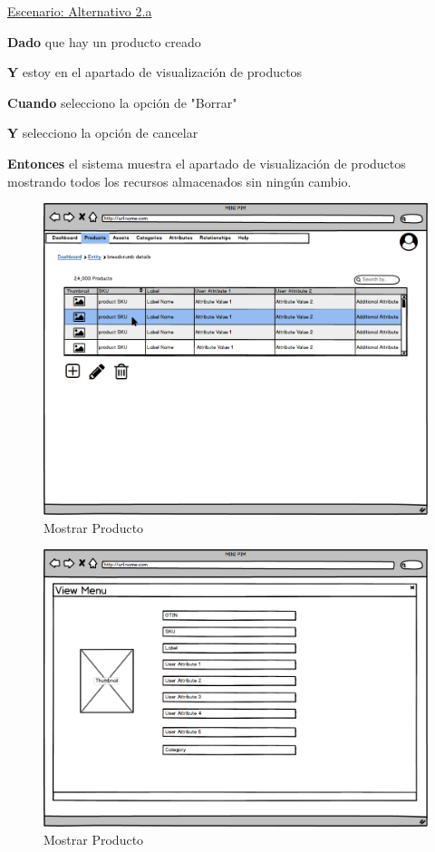 \underline{Escenario: Alternativo 2.a}\par
\vspace{0.15cm}
\textbf{Dado} que hay un producto creado\par
\textbf{Y} estoy en el apartado de visualización de productos\par
\textbf{Cuando} selecciono la opción de "Borrar"\par
\textbf{Y} selecciono la opción de cancelar\par
\textbf{Entonces} el sistema muestra el apartado de visualización de productos mostrando todos los recursos almacenados sin ningún cambio.\par
\vspace{0.20cm}


\begin{figure}[H]
    \includegraphics[width=1\linewidth]{mockups/RF2.X_MostrarProducto(Desde Listado).png}
    \caption{Mostrar Producto}
   \end{figure}
\vspace{1.0cm}
\begin{figure}[H]
    \includegraphics[width=1\linewidth]{mockups/RF2.X_MostrarProducto(Menu visualizacion).png}
    \caption{Mostrar Producto}
   \end{figure}
\vspace{1.0cm}


\newpage %